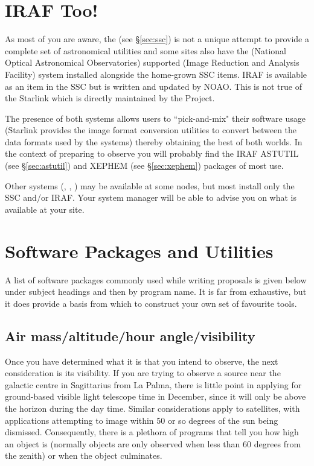 \section{IRAF Too!} 
\label{sec:iraf}

As most of you are aware, the {\SSCref} (see \S{\ref{sec:ssc}}) is not a unique attempt to provide
a complete set of astronomical utilities and some {\STARLINKref} sites also have the 
{\NOAOref} (National Optical Astronomical Observatories) supported {\IRAFref} 
(Image Reduction and Analysis Facility) system installed alongside the home-grown SSC
items. IRAF is available as an item in the SSC but is written and updated
by NOAO. This is not true of the Starlink {\FIGAROref} which is directly maintained
by the Project. 

The presence of both systems allows users to ``pick-and-mix" their
software usage (Starlink provides the image format conversion utilities 
{\CONVERTref} to convert between the data formats used by the systems) 
thereby obtaining the best of both worlds. In the context
of preparing to observe you will probably find the IRAF ASTUTIL (see \S{\ref{sec:astutil}}) 
and XEPHEM (see \S{\ref{sec:xephem}}) packages of most use.

Other systems ({\AIPSref}, {\MIDASref}, {\XANADUref}) may be available
at some nodes, but most install only the SSC and/or IRAF. Your system manager
will be able to advise you on what is available at your site.


\section{Software Packages and Utilities} 
\label{sec:packages}
 
A list of software packages commonly used while writing proposals is given
below under subject headings and then by program name. It is far from 
exhaustive, but it does provide a basis from which to construct your own 
set of favourite tools. 

\subsection{Air mass/altitude/hour angle/visibility} 
\label{sec:airmass}

Once you have determined what it is that you intend to observe, the 
next consideration is its visibility. If you are trying to observe 
a source near the galactic centre in Sagittarius from La Palma, there is
little point in
applying for ground-based visible light telescope time in December, since 
it will only be above the horizon during the day time. Similar 
considerations apply to satellites, with applications attempting to image 
within 50 or so degrees of the sun being dismissed. Consequently,
there is a plethora of programs that tell you how high an object is
(normally objects are only observed when less than 60 degrees from the 
zenith) or when the object culminates.

